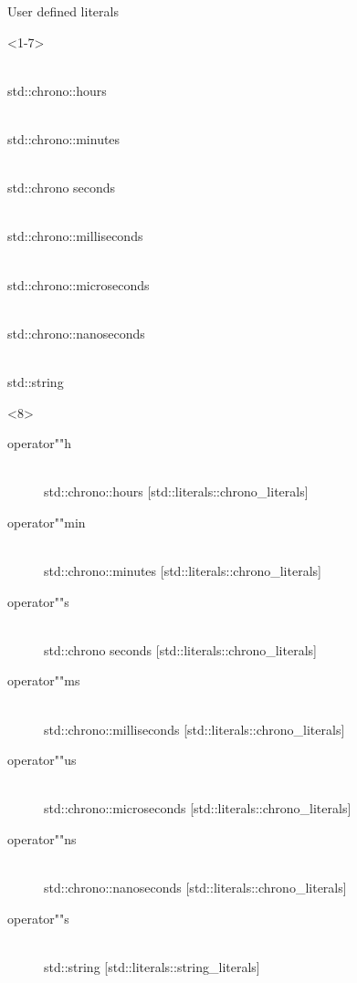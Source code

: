 \documentclass[10pt]{beamer}
\begin{document}
\begin{frame}{User defined literals}

	\begin{onlyenv}<1-7>
	\begin{description}[<+- |alert@+>]
		\item[operator""h] \hfill \\ std::chrono::hours
		\item[operator""min] \hfill \\ std::chrono::minutes
		\item[operator""s] \hfill \\ std::chrono seconds
		\item[operator""ms] \hfill \\ std::chrono::milliseconds
		\item[operator""us] \hfill \\ std::chrono::microseconds
		\item[operator""ns] \hfill \\ std::chrono::nanoseconds
		\item[operator""s] \hfill \\ std::string
	\end{description}
	\end{onlyenv}

	\begin{onlyenv}
		\begin{description}
		\item[operator""h] \hfill \\ std::chrono::hours \hfill { \footnotesize  [std::literals::chrono\_literals] }
		\item[operator""min] \hfill \\ std::chrono::minutes \hfill { \footnotesize  [std::literals::chrono\_literals] }
		\item[operator""s] \hfill \\ std::chrono seconds \hfill { \footnotesize  [std::literals::chrono\_literals] }
		\item[operator""ms] \hfill \\ std::chrono::milliseconds \hfill { \footnotesize  [std::literals::chrono\_literals] }
		\item[operator""us] \hfill \\ std::chrono::microseconds \hfill { \footnotesize  [std::literals::chrono\_literals] }
		\item[operator""ns] \hfill \\ std::chrono::nanoseconds \hfill { \footnotesize  [std::literals::chrono\_literals] }
		\item[operator""s] \hfill \\ std::string \hfill { \footnotesize  \alert{[std::literals::string\_literals]} }
	\end{description}
	\end{onlyenv}
\end{frame}
\end{document}
